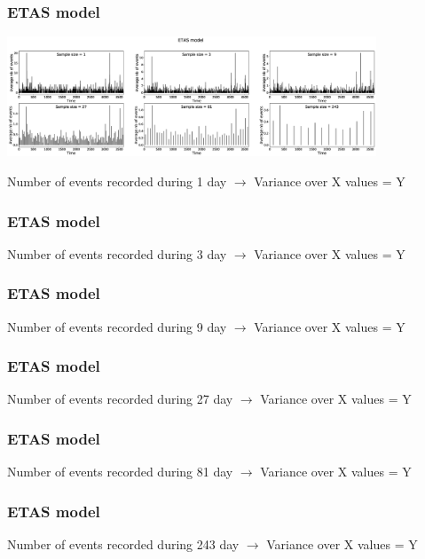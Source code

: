 \documentclass{beamer}
\begin{document}
	\begin{frame}
		\frametitle{ETAS model}
		\begin{center}
			\includegraphics[width=11cm, trim={0cm 0cm 0cm 0cm}, clip]{other/ETAS.eps}
		\end{center}
		Number of events recorded during 1 day $\rightarrow$ Variance over X values = Y
	\end{frame}

	\begin{frame}
		\frametitle{ETAS model}
		Number of events recorded during 3 day $\rightarrow$ Variance over X values = Y
	\end{frame}

	\begin{frame}
		\frametitle{ETAS model}
		Number of events recorded during 9 day $\rightarrow$ Variance over X values = Y
	\end{frame}

	\begin{frame}
		\frametitle{ETAS model}
		Number of events recorded during 27 day $\rightarrow$ Variance over X values = Y
	\end{frame}

	\begin{frame}
		\frametitle{ETAS model}
		Number of events recorded during 81 day $\rightarrow$ Variance over X values = Y
	\end{frame}

	\begin{frame}
		\frametitle{ETAS model}
		Number of events recorded during 243 day $\rightarrow$ Variance over X values = Y
	\end{frame}
\end{document}
